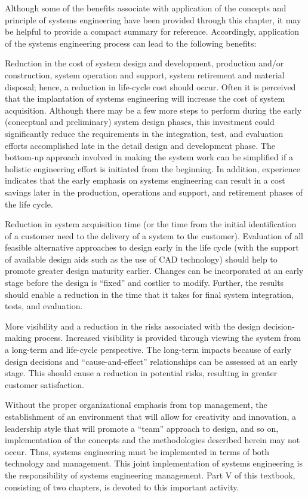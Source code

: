 Although some of the benefits associate with application of the concepts and principle of systems engineering have been provided through this chapter, it may be helpful to provide a compact summary for reference. Accordingly, application of the systems engineering process can lead to the following benefits:

Reduction in the cost of system design and development, production and/or construction, system operation and support, system retirement and material disposal; hence, a reduction in life-cycle cost should occur. Often it is perceived that the implantation of systems engineering will increase the cost of system acquisition. Although there may be a few more steps to perform during the early (conceptual and preliminary) system design phases, this investment could significantly reduce the requirements in the integration, test, and evaluation efforts accomplished late in the detail design and development phase. The bottom-up approach involved in making the system work can be simplified if a holistic engineering effort is initiated from the beginning. In addition, experience indicates that the early emphasis on systems engineering can result in a cost savings later in the production, operations and support, and retirement phases of the life cycle.

Reduction in system acquisition time (or the time from the initial identification of a customer need to the delivery of a system to the customer). Evaluation of all feasible alternative approaches to design early in the life cycle (with the support of available design aids such as the use of CAD technology) should help to promote greater design maturity earlier. Changes can be incorporated at an early stage before the design is “fixed” and costlier to modify. Further, the results should enable a reduction in the time that it takes for final system integration, tests, and evaluation.

More visibility and a reduction in the risks associated with the design decision-making process. Increased visibility is provided through viewing the system from a long-term and life-cycle perspective. The long-term impacts because of early design decisions and “cause-and-effect” relationships can be assessed at an early stage. This should cause a reduction in potential risks, resulting in greater customer satisfaction.

Without the proper organizational emphasis from top management, the establishment of an environment that will allow for creativity and innovation, a leadership style that will promote a “team” approach to design, and so on, implementation of the concepts and the methodologies described herein may not occur. Thus, systems engineering must be implemented in terms of both technology and management. This joint implementation of systems engineering is the responsibility of systems engineering management. Part V of this textbook, consisting of two chapters, is devoted to this important activity.

